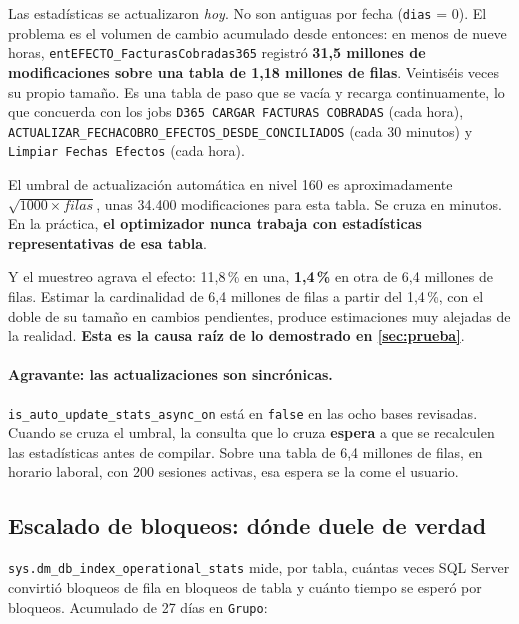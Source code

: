 \documentclass[11pt,a4paper]{article}
\newcommand{\cod}[1]{\texttt{\small #1}}
\begin{document}
Las estadísticas se actualizaron \emph{hoy}. No son antiguas por fecha
(\cod{dias} = 0). El problema es el volumen de cambio acumulado desde
entonces: en menos de nueve horas,
\cod{entEFECTO\_FacturasCobradas365} registró \textbf{31,5 millones de
modificaciones sobre una tabla de 1,18 millones de filas}. Veintiséis veces
su propio tamaño. Es una tabla de paso que se vacía y recarga continuamente,
lo que concuerda con los jobs \cod{D365 CARGAR FACTURAS COBRADAS} (cada hora),
\cod{ACTUALIZAR\_FECHACOBRO\_EFECTOS\_DESDE\_CONCILIADOS} (cada 30 minutos) y
\cod{Limpiar Fechas Efectos} (cada hora).

El umbral de actualización automática en nivel 160 es aproximadamente
$\sqrt{1000 \times filas}$, unas 34.400 modificaciones para esta tabla. Se
cruza en minutos. En la práctica, \textbf{el optimizador nunca trabaja con
estadísticas representativas de esa tabla}.

Y el muestreo agrava el efecto: 11,8\,\% en una, \textbf{1,4\,\%} en otra de
6,4 millones de filas. Estimar la cardinalidad de 6,4 millones de filas a
partir del 1,4\,\%, con el doble de su tamaño en cambios pendientes, produce
estimaciones muy alejadas de la realidad. \textbf{Esta es la causa raíz de lo
demostrado en \ref{sec:prueba}}.

\paragraph{Agravante: las actualizaciones son sincrónicas.}
\cod{is\_auto\_update\_stats\_async\_on} está en \cod{false} en las ocho
bases revisadas. Cuando se cruza el umbral, la consulta que lo cruza
\textbf{espera} a que se recalculen las estadísticas antes de compilar. Sobre
una tabla de 6,4 millones de filas, en horario laboral, con 200 sesiones
activas, esa espera se la come el usuario.

\subsection{Escalado de bloqueos: dónde duele de verdad}
\label{sec:escalado}

\cod{sys.dm\_db\_index\_operational\_stats} mide, por tabla, cuántas veces
SQL Server convirtió bloqueos de fila en bloqueos de tabla y cuánto tiempo se
esperó por bloqueos. Acumulado de 27 días en \cod{Grupo}:
\end{document}
